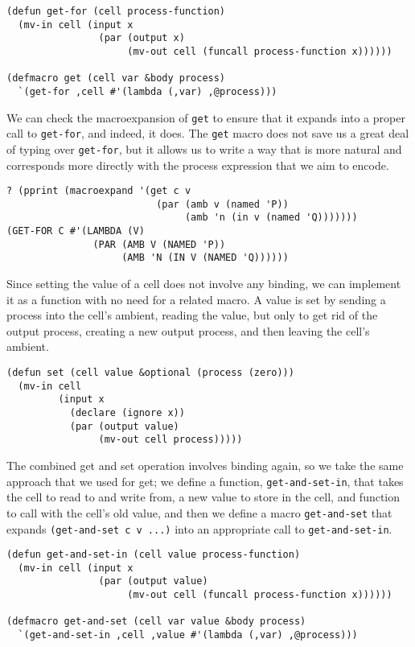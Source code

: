 \documentclass[12pt]{article}
\begin{document}
\begin{verbatim}
(defun get-for (cell process-function)
  (mv-in cell (input x
                (par (output x)
                     (mv-out cell (funcall process-function x))))))

(defmacro get (cell var &body process)
  `(get-for ,cell #'(lambda (,var) ,@process)))
\end{verbatim}

We can check the macroexpansion of \texttt{get} to ensure that it expands into a proper call to \texttt{get-for}, and indeed, it does.
The \texttt{get} macro does not save us a great deal of typing over \texttt{get-for}, but it allows us to write a way that is more natural and corresponds more directly with the process expression that we aim to encode.

\begin{verbatim}
? (pprint (macroexpand '(get c v 
                          (par (amb v (named 'P))
                               (amb 'n (in v (named 'Q)))))))
(GET-FOR C #'(LAMBDA (V)
               (PAR (AMB V (NAMED 'P))
                    (AMB 'N (IN V (NAMED 'Q))))))
\end{verbatim}

Since setting the value of a cell does not involve any binding, we can implement it as a function with no need for a related macro.
A value is set by sending a process into the cell's ambient, reading the value, but only to get rid of the output process, creating a new output process, and then leaving the cell's ambient.

\begin{verbatim}
(defun set (cell value &optional (process (zero)))
  (mv-in cell
         (input x
           (declare (ignore x))
           (par (output value)
                (mv-out cell process)))))
\end{verbatim}

The combined get and set operation involves binding again, so we take the same approach that we used for get;
we define a function, \texttt{get-and-set-in}, that takes the cell to read to and write from, a new value to store in the cell, and function to call with the cell's old value, and then we define a macro \texttt{get-and-set} that expands \texttt{(get-and-set c v ...)} into an appropriate call to \texttt{get-and-set-in}.

\begin{verbatim}
(defun get-and-set-in (cell value process-function)
  (mv-in cell (input x
                (par (output value)
                     (mv-out cell (funcall process-function x))))))

(defmacro get-and-set (cell var value &body process)
  `(get-and-set-in ,cell ,value #'(lambda (,var) ,@process)))
\end{verbatim}
\end{document}
